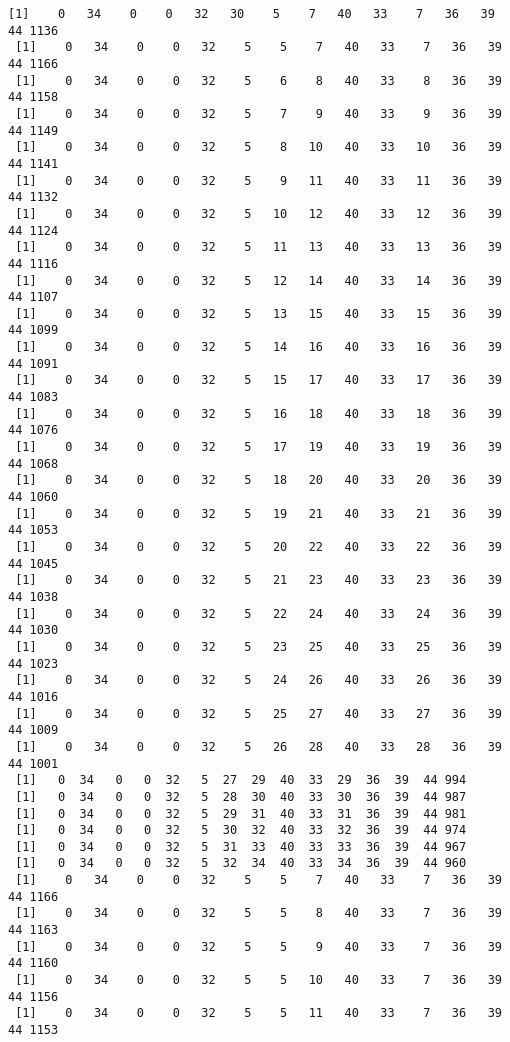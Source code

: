 \documentclass[11pt]{article}
\begin{document}
\begin{Verbatim}[commandchars=\\\{\}]
 [1]    0   34    0    0   32   30    5    7   40   33    7   36   39   44 1136
 [1]    0   34    0    0   32    5    5    7   40   33    7   36   39   44 1166
 [1]    0   34    0    0   32    5    6    8   40   33    8   36   39   44 1158
 [1]    0   34    0    0   32    5    7    9   40   33    9   36   39   44 1149
 [1]    0   34    0    0   32    5    8   10   40   33   10   36   39   44 1141
 [1]    0   34    0    0   32    5    9   11   40   33   11   36   39   44 1132
 [1]    0   34    0    0   32    5   10   12   40   33   12   36   39   44 1124
 [1]    0   34    0    0   32    5   11   13   40   33   13   36   39   44 1116
 [1]    0   34    0    0   32    5   12   14   40   33   14   36   39   44 1107
 [1]    0   34    0    0   32    5   13   15   40   33   15   36   39   44 1099
 [1]    0   34    0    0   32    5   14   16   40   33   16   36   39   44 1091
 [1]    0   34    0    0   32    5   15   17   40   33   17   36   39   44 1083
 [1]    0   34    0    0   32    5   16   18   40   33   18   36   39   44 1076
 [1]    0   34    0    0   32    5   17   19   40   33   19   36   39   44 1068
 [1]    0   34    0    0   32    5   18   20   40   33   20   36   39   44 1060
 [1]    0   34    0    0   32    5   19   21   40   33   21   36   39   44 1053
 [1]    0   34    0    0   32    5   20   22   40   33   22   36   39   44 1045
 [1]    0   34    0    0   32    5   21   23   40   33   23   36   39   44 1038
 [1]    0   34    0    0   32    5   22   24   40   33   24   36   39   44 1030
 [1]    0   34    0    0   32    5   23   25   40   33   25   36   39   44 1023
 [1]    0   34    0    0   32    5   24   26   40   33   26   36   39   44 1016
 [1]    0   34    0    0   32    5   25   27   40   33   27   36   39   44 1009
 [1]    0   34    0    0   32    5   26   28   40   33   28   36   39   44 1001
 [1]   0  34   0   0  32   5  27  29  40  33  29  36  39  44 994
 [1]   0  34   0   0  32   5  28  30  40  33  30  36  39  44 987
 [1]   0  34   0   0  32   5  29  31  40  33  31  36  39  44 981
 [1]   0  34   0   0  32   5  30  32  40  33  32  36  39  44 974
 [1]   0  34   0   0  32   5  31  33  40  33  33  36  39  44 967
 [1]   0  34   0   0  32   5  32  34  40  33  34  36  39  44 960
 [1]    0   34    0    0   32    5    5    7   40   33    7   36   39   44 1166
 [1]    0   34    0    0   32    5    5    8   40   33    7   36   39   44 1163
 [1]    0   34    0    0   32    5    5    9   40   33    7   36   39   44 1160
 [1]    0   34    0    0   32    5    5   10   40   33    7   36   39   44 1156
 [1]    0   34    0    0   32    5    5   11   40   33    7   36   39   44 1153

\end{Verbatim}
\end{document}
